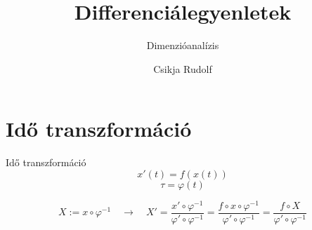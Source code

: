 \documentclass[10pt]{beamer}
\title{Differenciálegyenletek}
\subtitle{Dimenzióanalízis}
\date{}
\author{Csikja Rudolf}
\institute{Budapesti Műszaki és Gazdaságtudományi Egyetem\\Matemaikai Intézet, Analízis Tanszék}
\begin{document}
\maketitle



\section{Idő transzformáció}
\begin{frame}[t]{Idő transzformáció}
\[x'(t) = f(x(t))\]
\[\tau = \varphi(t)\]

\[X := x\circ \varphi^{-1} \quad \to \quad X' = 
\frac{x'\circ \varphi^{-1}}{\varphi' \circ \varphi^{-1}} = 
\frac{f\circ x\circ \varphi^{-1}}{\varphi' \circ \varphi^{-1}} = 
\frac{f\circ X}{\varphi' \circ \varphi^{-1}}\]


\end{frame}
\end{document}
